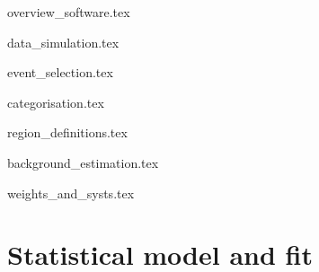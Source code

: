 

{overview_software.tex}




{data_simulation.tex}




{event_selection.tex}




{categorisation.tex}




{region_definitions.tex}




{background_estimation.tex}




{weights_and_systs.tex}




\section{Statistical model and fit}
\label{sec:htoinv_satistical_treatment}




